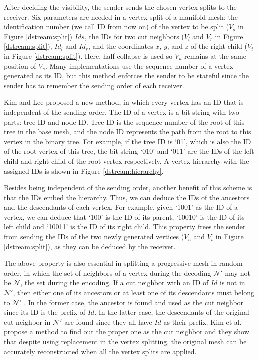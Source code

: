     After deciding the visibility, the sender sends the chosen vertex splits to the receiver.
    Six parameters are needed in a vertex split of a manifold mesh: the identification number
    (we call ID from now on) of the vertex to be split
    ($V_s$ in Figure \ref{dstream:split}) $Ids$, 
    the IDs for two cut neighbors 
    ($V_l$ and $V_r$ in Figure \ref{dstream:split}), $Id_l$ and $Id_r$,
    and the coordinates $x$, $y$, and $z$ of the right child ($V_t$ in
    Figure \ref{dstream:split}). Here, half collapse is used so $V_u$ remains at the same position
    of $V_s$. Many implementations use the sequence number of a vertex generated as its ID,
    but this method enforces the sender to be stateful since the sender has to remember 
    the sending order of each receiver.
    
    Kim and Lee \cite{kim01truly} proposed a new method, in which every vertex has
    an ID that is independent of the sending order. The ID of a vertex is a bit string
    with two parts: tree ID and node ID.
    Tree ID is the sequence number of the root of this tree in the base mesh, 
    and the node ID represents the path from the root to this vertex in the binary tree.
    For example, if the tree ID is `01', which is also the ID of
    the root vertex of this tree, the bit string `010' and `011' are the IDs
    of the left child and right child of the root vertex respectively. 
    A vertex hierarchy with the assigned IDs is shown in 
    Figure \ref{dstream:hierarchy}.
    
    Besides being independent of the sending order, another benefit of this scheme
    is that the IDs embed the hierarchy. Thus,  
    we can deduce the IDs of the ancestors and the descendants of each vertex. 
    For example, given `1001' as the ID of a vertex,
    we can deduce that `100' is the ID of its parent, `10010' is the ID of its left child and 
    `10011' is the ID of its right child. 
    This property frees the sender from sending the IDs of the two newly generated vertices
    ($V_u$ and $V_t$ in Figure \ref{dstream:split}), as they can be deduced by the receiver.
    
    The above property is also essential in splitting
    a progressive mesh in random order, in which the set of neighbors of a vertex
    during the decoding $\mathcal{N}'$ may not be $\mathcal{N}$, the set 
    during the encoding. If a cut neighbor with an ID of $Id$ %
    is not in $\mathcal{N}'$, then either one of its 
    ancestors or at least one of its descendants must belong to $\mathcal{N}'$ \cite{multiresolution:kim}.
    In the former case, the ancestor is found and used as 
    the cut neighbor since its ID is the prefix of $Id$.  
    In the latter case, the descendants of the original 
    cut neighbor in $\mathcal{N}'$ are found since they all have $Id$ as their prefix.
    Kim et al. \cite{multiresolution:kim} propose a method to find out the 
    proper one as the cut neighbor and they show that despite using replacement
    in the vertex splitting, the original mesh can be 
    accurately reconstructed when all the vertex splits are applied.


